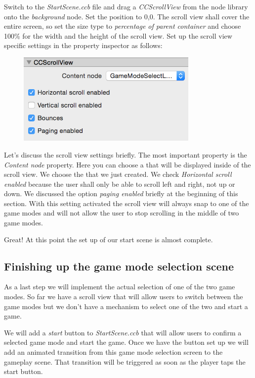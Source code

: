 \begin{leftbar}
Switch to the \textit{StartScene.ccb} file and drag a \textit{CCScrollView} from
the node library onto the \textit{background} node. Set the position to 0,0. The
scroll view shall cover the entire screen, so set the size type to
\textit{percentage of parent container} and choose 100\% for the width and the
height of the scroll view. Set up the scroll view specific settings in the
property inspector as follows:
\begin{figure}[H]
\centering
\includegraphics[width=250pt]{images/Chapter7/scrollview_settings.png}
\end{figure}
\end{leftbar}
Let's discuss the scroll view settings briefly. The most important property is
the \textit{Content node} property. Here you can choose a \ccbfile{} that will
be displayed inside of the scroll view. We choose the
 that we just created. We check
\textit{Horizontal scroll enabled} because the user shall only be able to scroll
left and right, not up or down. We discussed the option \textit{paging enabled}
briefly at the beginning of this section. With this setting activated the scroll
view will always snap to one of the game modes and will not allow the user to
stop scrolling in the middle of two game modes.

Great! At this point the set up of our start scene is almost complete.

\subsection{Finishing up the game mode selection scene}
As a last step we will implement the actual selection of one of the two game
modes. So far we have a scroll view that will allow users to switch between the
game modes but we don't have a mechanism to select one of the two and start a
game.

We will add a \textit{start} button to \textit{StartScene.ccb} that will
allow users to confirm a selected game mode and start the game. Once we have the button set up we will
add an animated transition from this game mode selection screen to the gameplay
scene. That transition will be triggered as soon as the player taps the start
button.

